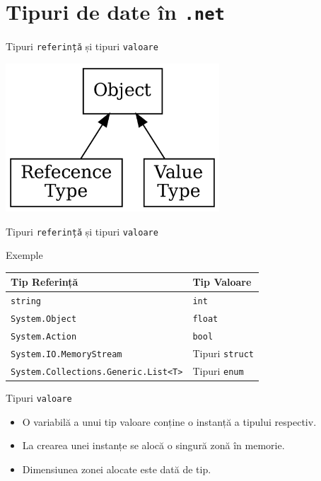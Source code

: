 \documentclass[presentation]{beamer}
\begin{document}
\section{Tipuri de date în \texttt{.net}}
\label{sec:org0646ae4}
\begin{frame}[label={sec:orgfc5367a},fragile]{Tipuri \texttt{referință} și tipuri \texttt{valoare}}
 \begin{center}
\includegraphics[width=0.6\textwidth]{./img/netcore-types.png}
\end{center}
\end{frame}
\begin{frame}[label={sec:org60b6bd6},fragile]{Tipuri \texttt{referință} și tipuri \texttt{valoare}}
 \begin{block}{Exemple}
\begin{center}
\begin{tabular}{ll}
Tip Referință & Tip Valoare\\
\hline
\texttt{string} & \texttt{int}\\
\texttt{System.Object} & \texttt{float}\\
\texttt{System.Action} & \texttt{bool}\\
\texttt{System.IO.MemoryStream} & Tipuri \texttt{struct}\\
\texttt{System.Collections.Generic.List<T>} & Tipuri \texttt{enum}\\
\end{tabular}
\end{center}
\end{block}
\end{frame}
\begin{frame}[label={sec:orgb6bcafd},fragile]{Tipuri \texttt{valoare}}
 \begin{itemize}
\item O variabilă a unui tip valoare conține o instanță a tipului respectiv.
\item La crearea unei instanțe se alocă o singură zonă în memorie.
\item Dimensiunea zonei alocate este dată de tip.
\end{itemize}
\end{frame}
\end{document}
